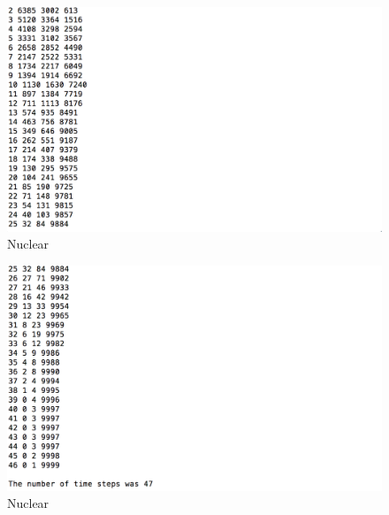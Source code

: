 \documentclass{article}
\begin{document}
\begin{figure}[h!]
\centering
\includegraphics{5.png}
\caption{Nuclear}
\label{fig:nuclear}
\end{figure}

\begin{figure}[h!]
\centering
\includegraphics{6.png}
\caption{Nuclear}
\label{fig:nuclear}
\end{figure}
\end{document}
